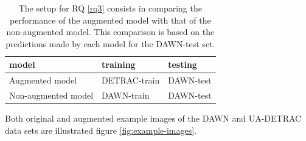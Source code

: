\documentclass[]{article}
\begin{document}
	\begin{table}[H]
		\captionsetup{font=scriptsize}
		\centering
		\small
		\begin{tabular}{lll}
			\toprule
			\textbf{model} & \textbf{training} & \textbf{testing} \\
			\midrule
			Augmented model & DETRAC-train & DAWN-test \\
			\hline
			Non-augmented model & DAWN-train & DAWN-test \\
			\bottomrule
		\end{tabular}
		\caption{The setup for RQ \ref{rq3} consists in comparing the performance of the augmented model with that of the non-augmented model. This comparison is based on the predictions made by each model for the DAWN-test set.}
		\label{table:setuprq3}
	\end{table}

	Both original and augmented example images of the DAWN and UA-DETRAC data sets are illustrated figure \ref{fig:example-images}.
	
\end{document}
